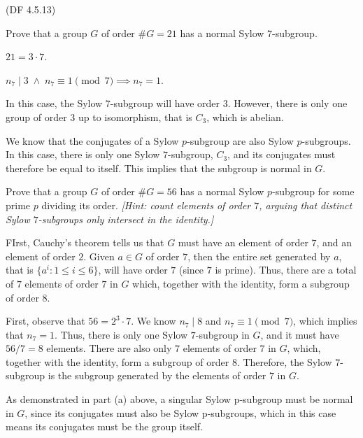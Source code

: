 \begin{problem}{(\textsf{DF 4.5.13})}
  \begin{enumalph}
    \item Prove that a group $G$ of order $\#G=21$ has a normal Sylow $7$-subgroup.
    \begin{Answer}
      $21 = 3 \cdot 7$.
      \begin{enumalph}
        \item $n_7 \mid 3\; \land \; n_7 \equiv 1 \pmod 7 \implies n_7 = 1$.
        
        \noindent
        In this case, the Sylow $7$-subgroup will have order $3$.
        However, there is only one group of order $3$ up to isomorphism,
        that is $C_3$, which is abelian.

        \noindent
        We know that the conjugates of a Sylow $p$-subgroup
        are also Sylow $p$-subgroups. In this case, there is only one
        Sylow $7$-subgroup, $C_3$, and its conjugates must therefore
        be equal to itself. This implies that the subgroup is normal in $G$.
      \end{enumalph}
    \end{Answer}
    \item Prove that a group $G$ of order $\#G=56$ has a normal Sylow $p$-subgroup
      for some prime $p$ dividing its order.
      \emph{[Hint: count elements of order $7$, arguing that distinct
      Sylow $7$-subgroups only intersect in the identity.]}
    \begin{Answer}
      
      FIrst, Cauchy's theorem tells us that $G$ must have an element of order $7$,
      and an element of order $2$.
      Given $a \in G$ of order $7$, then the entire set generated by $a$,
      that is $\{ a^i \colon 1 \le i \le 6 \}$, will have order $7$ (since $7$ is prime).
      Thus, there are a total of $7$ elements of order $7$ in $G$ which,
      together with the identity, form a subgroup of order $8$.
      
      First, observe that $56 = 2^3 \cdot 7$.
      We know  $n_7 \mid 8$ and $n_7 \equiv 1 \pmod 7$, which implies that $n_7 = 1$.
      Thus, there is only one Sylow $7$-subgroup in $G$, and it must have $56/7 = 8$ elements.
      There are also only $7$ elements of order $7$ in $G$,
      which, together with the identity, form a subgroup of order $8$.
      Therefore, the Sylow $7$-subgroup is the subgroup generated
      by the elements of order $7$ in $G$.

      \noindent
      As demonstrated in part (a) above, a singular Sylow p-subgroup must be normal
      in $G$, since its conjugates must also be Sylow p-subgroups, which in this case
      means its conjugates must be the group itself.
    \end{Answer}
  \end{enumalph}
\end{problem}

